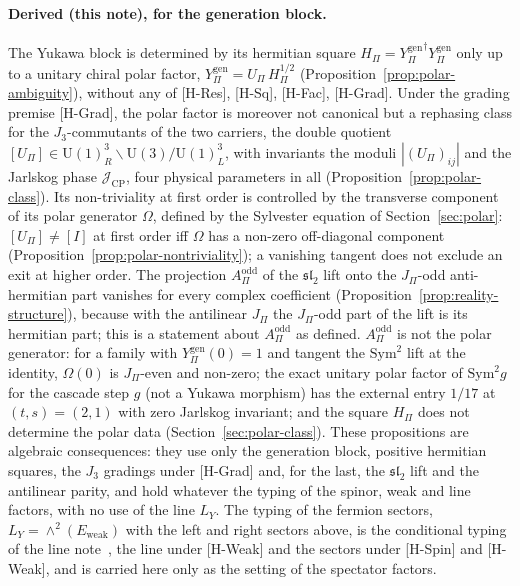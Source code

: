 \documentclass[11pt]{article}
\theoremstyle{definition}
\theoremstyle{remark}
\newcommand{\JPi}{J_{\Pi}}
\newcommand{\Jthree}{J_{3}}
\newcommand{\Eweak}{E_{\mathrm{weak}}}
\newcommand{\LY}{L_{Y}}
\newcommand{\Ygen}{{Y^{\mathrm{gen}}_{\Pi}}}
\newcommand{\JCP}{\mathcal{J}_{\mathrm{CP}}}
\newcommand{\Hpi}{H_{\Pi}}
\newcommand{\Upi}{U_{\Pi}}
\newcommand{\Opol}{\Omega}
\newcommand{\Aodd}{A_{\Pi}^{\mathrm{odd}}}
\newcommand{\Sym}{\mathrm{Sym}}
\newcommand{\UU}{\mathrm{U}}
\begin{document}
    \paragraph{Derived (this note), for the generation block.}
      The Yukawa block is determined by its hermitian square $\Hpi = \Ygen^{\dagger}\Ygen$ only up to a unitary chiral
      polar factor, $\Ygen = \Upi\,\Hpi^{1/2}$ (Proposition~\ref{prop:polar-ambiguity}), without any of [H-Res], [H-Sq],
      [H-Fac], [H-Grad].
      Under the grading premise [H-Grad], the polar factor is moreover not canonical but a rephasing class for the
      $\Jthree$-commutants of the two carriers, the double quotient
      $[\Upi] \in \UU(1)^{3}_{R} \backslash \UU(3) / \UU(1)^{3}_{L}$, with invariants the moduli
      $|(\Upi)_{ij}|$ and the Jarlskog phase $\JCP$, four physical parameters in all
      (Proposition~\ref{prop:polar-class}).
      Its non-triviality at first order is controlled by the transverse component of its polar generator $\Opol$,
      defined by the Sylvester equation of Section~\ref{sec:polar}: $[\Upi] \neq [I]$ at first order iff $\Opol$ has a
      non-zero off-diagonal component (Proposition~\ref{prop:polar-nontriviality}); a vanishing tangent does not exclude
      an exit at higher order.
      The projection $\Aodd$ of the $\mathfrak{sl}_{2}$ lift onto the $\JPi$-odd anti-hermitian part vanishes for
      every complex coefficient (Proposition~\ref{prop:reality-structure}), because with the antilinear $\JPi$ the
      $\JPi$-odd part of the lift is its hermitian part; this is a statement about $\Aodd$ as defined.
      $\Aodd$ is not the polar generator: for a family with $\Ygen(0) = 1$ and tangent the $\Sym^{2}$ lift at the
      identity, $\Opol(0)$ is $\JPi$-even and non-zero; the exact unitary polar factor of $\Sym^{2}g$ for the
      cascade step $g$ (not a Yukawa morphism) has the external entry $1/17$ at $(t, s) = (2, 1)$ with zero Jarlskog
      invariant; and the square $\Hpi$ does not determine the polar data
      (Section~\ref{sec:polar-class}).
      These propositions are algebraic consequences: they use only the generation block, positive hermitian squares, the
      $\Jthree$ gradings under [H-Grad] and, for the last, the $\mathfrak{sl}_{2}$ lift and the antilinear parity, and
      hold whatever the typing of the spinor, weak and line factors, with no use of the line $\LY$.
      The typing of the fermion sectors, $\LY = \wedge^{2}(\Eweak)$ with the left and right sectors above, is the
      conditional typing of the line note~\cite{Beau2026pyl}, the line under [H-Weak] and the sectors under [H-Spin] and
      [H-Weak], and is carried here only as
      the setting of the spectator factors.
\end{document}
